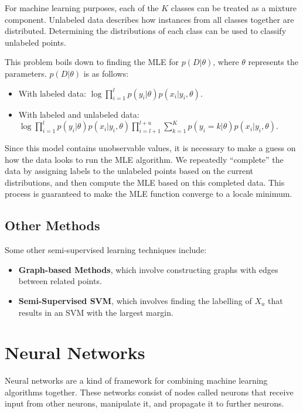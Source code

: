 \documentclass[12pt,titlepage]{article}
\let\stdsection\section
\renewcommand\section{\clearpage\stdsection}
\begin{document}
      For machine learning purposes, each of the $K$ classes can be treated as a mixture component. Unlabeled data describes how instances from all
      classes together are distributed. Determining the distributions of each class can be used to classify unlabeled points.

      This problem boils down to finding the MLE for $p(D|\theta)$, where $\theta$ represents the parameters. $p(D|\theta)$ is as follows:
      \begin{itemize}
        \item With labeled data: $\log \prod_{i=1}^l p(y_i|\theta) p(x_i|y_i,\theta)$.
        \item With labeled and unlabeled data: $\log \prod_{i=1}^l p(y_i|\theta) p(x_i|y_i,\theta) \prod_{i=l+1}^{l+u} \sum_{k=1}^K p(y_i=k|\theta) p(x_i|y_i,\theta)$.
      \end{itemize}

      Since this model contains unobservable values, it is necessary to make a guess on how the data looks to run the MLE algorithm. We repeatedly ``complete'' the
      data by assigning labels to the unlabeled points based on the current distributions, and then compute the MLE based on this completed data. This process is
      guaranteed to make the MLE function converge to a locale minimum.

    \subsection{Other Methods}
      Some other semi-supervised learning techniques include:
      \begin{itemize}
        \item \textbf{Graph-based Methods}, which involve constructing graphs with edges between related points.
        \item \textbf{Semi-Supervised SVM}, which involves finding the labelling of $X_u$ that results in an SVM with the largest margin.
      \end{itemize}

  \section{Neural Networks}
    Neural networks are a kind of framework for combining machine learning algorithms together. These networks consist of nodes called neurons that receive input
    from other neurons, manipulate it, and propagate it to further neurons.
\end{document}

